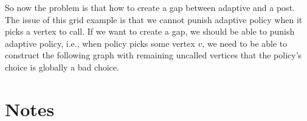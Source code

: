 \documentclass[12pt]{amsart}
\begin{document}
So now the problem is that how to create a gap between adaptive and a post. The issue of this grid example is that we cannot punish adaptive policy when it picks a vertex to call. If we want to create a gap, we should be able to punish adaptive policy, i.e., when policy picks some vertex $v$, we need to be able to construct the following graph with remaining uncalled vertices that the policy's choice is globally a bad choice.


\section{Notes}




\printbibliography
\end{document}
